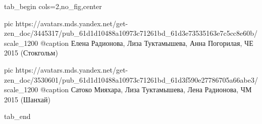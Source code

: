  
 
 
 
 


\ifcmt
  tab_begin cols=2,no_fig,center

     pic https://avatars.mds.yandex.net/get-zen_doc/3445317/pub_61d1d10488a10973c71261bd_61d3e73535163e7c5cc8e60b/scale_1200
		 @caption Елена Радионова, Лиза Туктамышева, Анна Погорилая, ЧЕ 2015 (Стокгольм)

		 pic https://avatars.mds.yandex.net/get-zen_doc/3530601/pub_61d1d10488a10973c71261bd_61d3f590e27786705a66abe3/scale_1200
		 @caption Сатоко Мияхара, Лиза Туктамышева, Лена Радионова, ЧМ 2015 (Шанхай)

  tab_end
\fi
